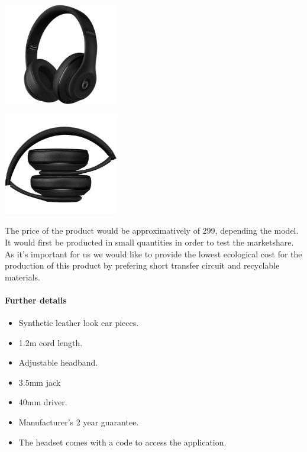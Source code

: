 \documentclass[12pt, a4paper]{article}
\newenvironment{Figure}
  {\par\medskip\noindent\minipage{\linewidth}}
  {\endminipage\par\medskip}
\begin{document}
    \begin{multicols}{2}
        \begin{Figure}
        \centering
        \includegraphics[width=5cm]{pictures/casque1.png}
        \end{Figure}
        \begin{Figure}
        \centering
        \includegraphics[width=5cm]{pictures/casque2.png}
        \end{Figure}
    \end{multicols}

    The price of the product would be approximatively of 299\EUR , depending the model. It would first be producted in small quantities in order to test the marketshare. As it's important for us we would like to provide the lowest ecological cost for the production of this product by prefering short transfer circuit and recyclable materials.

    \paragraph{Further details}
    \begin{itemize}
        \item Synthetic leather look ear pieces.
        \item 1.2m cord length.
        \item Adjustable headband.
        \item 3.5mm jack
        \item 40mm driver.
        \item Manufacturer's 2 year guarantee.
        \item The headset comes with a code to access the application.
    \end{itemize}
\end{document}
